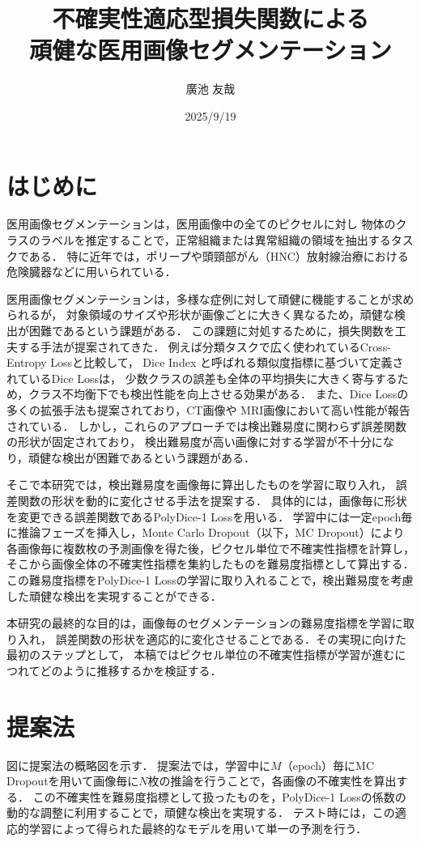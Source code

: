 \documentclass[10pt, a4paper, twocolumn]{jarticle}
\title{不確実性適応型損失関数による \\
頑健な医用画像セグメンテーション}
\author{廣池 友哉}
\affiliation{広島大学 大学院先進理工系科学研究科 情報科学プログラム}
\date{2025/9/19}
\begin{document}
\maketitle


\section{はじめに}
医用画像セグメンテーションは，医用画像中の全てのピクセルに対し
物体のクラスのラベルを推定することで，正常組織または異常組織の領域を抽出するタスクである．
特に近年では，ポリープ\cite{ji2022video}や頭頸部がん（HNC）放射線治療における危険臓器\cite{maleki2020machine}などに用いられている．

医用画像セグメンテーションは，多様な症例に対して頑健に機能することが求められるが，
対象領域のサイズや形状が画像ごとに大きく異なるため，頑健な検出が困難であるという課題がある．
この課題に対処するために，損失関数を工夫する手法が提案されてきた．
例えば分類タスクで広く使われているCross-Entropy Loss\cite{long2015fully}と比較して，
Dice Index と呼ばれる類似度指標に基づいて定義されているDice Loss\cite{milletari2016v}は，
少数クラスの誤差も全体の平均損失に大きく寄与するため，クラス不均衡下でも検出性能を向上させる効果がある．
また、Dice Lossの多くの拡張手法も提案されており，CT画像\cite{zhu2019anatomynet, 9109297}や
MRI画像\cite{KATO2024107695}において高い性能が報告されている．
しかし，これらのアプローチでは検出難易度に関わらず誤差関数の形状が固定されており，
検出難易度が高い画像に対する学習が不十分になり，頑健な検出が困難であるという課題がある．

そこで本研究では，検出難易度を画像毎に算出したものを学習に取り入れ，
誤差関数の形状を動的に変化させる手法を提案する．
具体的には，画像毎に形状を変更できる誤差関数であるPolyDice-1 Lossを用いる．
学習中には一定epoch毎に推論フェーズを挿入し，Monte Carlo Dropout\cite{pmlr-v48-gal16}（以下，MC Dropout）により
各画像毎に複数枚の予測画像を得た後，ピクセル単位で不確実性指標を計算し，そこから画像全体の不確実性指標を集約したものを難易度指標として算出する．
この難易度指標をPolyDice-1 Lossの学習に取り入れることで，検出難易度を考慮した頑健な検出を実現することができる．

本研究の最終的な目的は，画像毎のセグメンテーションの難易度指標を学習に取り入れ，
誤差関数の形状を適応的に変化させることである．その実現に向けた最初のステップとして，
本稿ではピクセル単位の不確実性指標が学習が進むにつれてどのように推移するかを検証する．

\section{提案法}
図に提案法の概略図を示す．
提案法では，学習中に$M$（epoch）毎にMC Dropoutを用いて画像毎に$N$枚の推論を行うことで，各画像の不確実性を算出する．
この不確実性を難易度指標として扱ったものを，PolyDice-1 Lossの係数の動的な調整に利用することで，頑健な検出を実現する．
テスト時には，この適応的学習によって得られた最終的なモデルを用いて単一の予測を行う．
\end{document}
